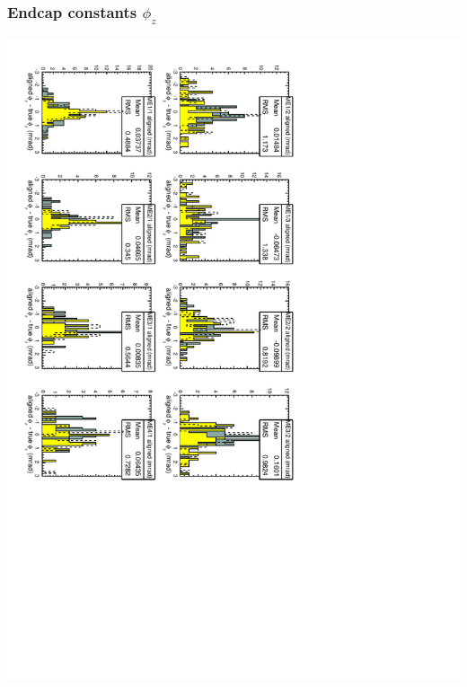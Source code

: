 \documentclass[compress]{beamer}
\begin{document}
\begin{frame}
\frametitle{Endcap constants $\phi_z$}
\includegraphics[height=\linewidth, angle=90]{S156_plots/muonhip_endcapphiz.pdf}
\end{frame}
\end{document}
